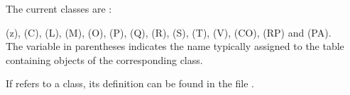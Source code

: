 The current classes are :

  (z),  (C),  (L),  (M),  (O),  (P),  (Q),  (R),  (S),  (T),  (V),  (CO),    (RP) and  (PA).\\

  The variable in parentheses indicates the name typically assigned to the table containing objects of the corresponding class.

If  refers to a class, its definition can be found in the file .
\endinput
